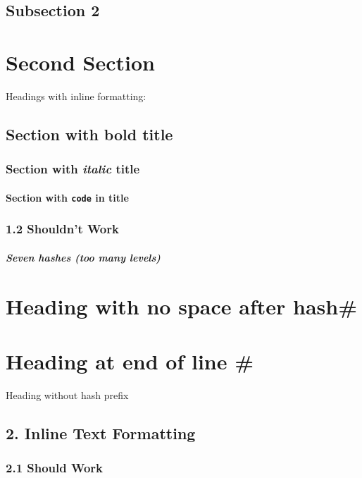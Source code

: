 \documentclass{article}
\begin{document}
\subsection{ Subsection 2}

\section{ Second Section}

Headings with inline formatting:

\subsection{ Section with \textbf{bold} title}

\subsubsection{ Section with \emph{italic} title}

\paragraph{ Section with \texttt{code} in title}

\subsubsection{ 1.2 Shouldn't Work}

\subparagraph{ Seven hashes (too many levels)}

\section{ Heading with no space after hash\#}

\section{ Heading at end of line \#}

Heading without hash prefix

\noindent\hrulefill

\subsection{ 2. Inline Text Formatting}

\subsubsection{ 2.1 Should Work}
\end{document}

